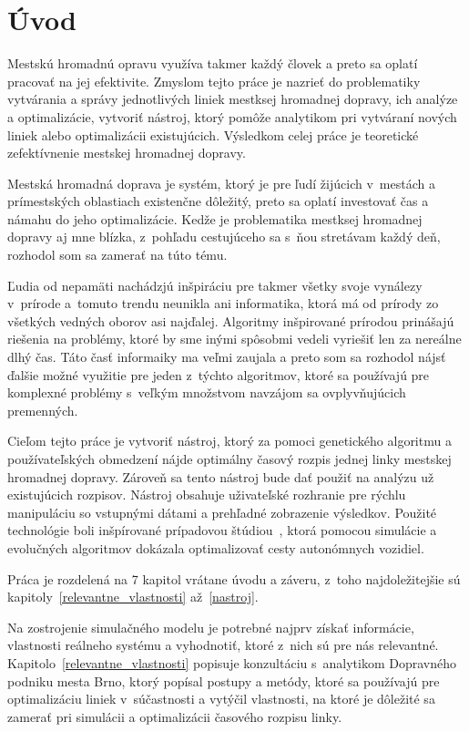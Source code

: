 \chapter{Úvod}\label{uvod}

Mestskú hromadnú opravu využíva takmer každý človek a preto sa oplatí pracovať na jej efektivite.
Zmyslom tejto práce je nazrieť do problematiky vytvárania a správy jednotlivých liniek mestksej hromadnej dopravy, ich analýze a optimalizácie, vytvoriť nástroj, ktorý pomôže analytikom pri vytváraní nových liniek alebo optimalizácii existujúcich.
Výsledkom celej práce je teoretické zefektívnenie mestskej hromadnej dopravy.

Mestská hromadná doprava je systém, ktorý je pre ľudí žijúcich v~mestách a prímestských oblastiach existenčne dôležitý, preto sa oplatí investovať čas a námahu do jeho optimalizácie.
Kedže je problematika mestksej hromadnej dopravy aj mne blízka, z~pohľadu cestujúceho sa s~ňou stretávam každý deň, rozhodol som sa zamerať na túto tému.

Ľudia od nepamäti nachádzjú inšpiráciu pre takmer všetky svoje vynálezy v~prírode a~tomuto trendu neunikla ani informatika, ktorá má od prírody zo všetkých vedných oborov asi najďalej.
Algoritmy inšpirované prírodou prinášajú riešenia na problémy, ktoré by sme inými spôsobmi vedeli vyriešiť len za nereálne dlhý čas.
Táto časť informaiky ma veľmi zaujala a preto som sa rozhodol nájsť ďalšie možné využitie pre jeden z~týchto algoritmov, ktoré sa používajú pre komplexné problémy s~veľkým množstvom navzájom sa ovplyvňujúcich premenných.

Cieľom tejto práce je vytvoriť nástroj, ktorý za pomoci genetického algoritmu a používateľských obmedzení nájde optimálny časový rozpis jednej linky mestskej hromadnej dopravy.
Zároveň sa tento nástroj bude dať použiť na analýzu už existujúcich rozpisov.
Nástroj obsahuje uživateľské rozhranie pre rýchlu manipuláciu so vstupnými dátami a prehľadné zobrazenie výsledkov.
Použité technológie boli inšpírované prípadovou štúdiou~\cite{kate2021optimising}, ktorá pomocou simulácie a evolučných algoritmov dokázala optimalizovať cesty autonómnych vozidiel.

Práca je rozdelená na 7 kapitol vrátane úvodu a záveru, z~toho najdoležitejšie sú kapitoly~\ref{relevantne_vlastnosti} až~\ref{nastroj}.

Na zostrojenie simulačného modelu je potrebné najprv získať informácie, vlastnosti reálneho systému a vyhodnotiť, ktoré z~nich sú pre nás relevantné.
Kapitolo~\ref{relevantne_vlastnosti} popisuje konzultáciu s~analytikom Dopravného podniku mesta Brno, ktorý popísal postupy a metódy, ktoré sa používajú pre optimalizáciu liniek v~súčastnosti a vytýčil vlastnosti, na ktoré je dôležité sa zamerať pri simulácii a optimalizácii časového rozpisu linky.

